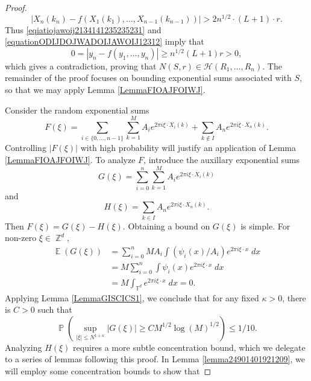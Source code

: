 \documentclass[dvipsnames,letterpaper,12pt]{article}
\numberwithin{equation}{section}
\DeclareMathOperator{\ZZ}{\mathbb{Z}}
\DeclareMathOperator{\TT}{\mathbb{T}}
\numberwithin{theorem}{section}
\DeclareMathOperator{\EE}{\mathbb{E}}
\DeclareMathOperator{\PP}{\mathbb{P}}
\begin{document}
\begin{proof}
    \begin{equation} \label{equationODIJDOJWADOIJAWOIJ12312}
        |X_n(k_n) - f(X_1(k_1),\dots,X_{n-1}(k_{n-1}))| > 2n^{1/2} \cdot (L+1) \cdot r.
    \end{equation}
    Thus \eqref{eqiatiojawoij2134141235235231} and \eqref{equationODIJDOJWADOIJAWOIJ12312} imply that
    \begin{equation}
        0 = |y_n - f(y_1,\dots,y_n)| \geq n^{1/2} (L+1) r > 0,
    \end{equation}
    which gives a contradiction, proving that $N(S,r) \in \mathcal{H}(R_1,\dots,R_n)$. The remainder of the proof focuses on bounding exponential sums associated with $S$, so that we may apply Lemma \ref{LemmaFIOAJFOIWJ}.


    Consider the random exponential sums
    \[ F(\xi) = \sum_{i \in \{ 0, \dots, n-1 \}} \sum_{k = 1}^M A_i e^{2 \pi i \xi \cdot X_i(k)} + \sum_{k \not \in I} A_n e^{2 \pi i \xi \cdot X_n(k)}. \]
    Controlling $|F(\xi)|$ with high probability will justify an application of Lemma \ref{LemmaFIOAJFOIWJ}. To analyze $F$, introduce the auxillary exponential sums
    \[ G(\xi) = \sum_{i = 0}^n \sum_{k = 1}^M A_i e^{2 \pi i \xi \cdot X_i(k)} \]
    and
    \[ H(\xi) = \sum_{k \in I} A_n e^{2 \pi i \xi \cdot X_n(k)}. \]
    Then $F(\xi) = G(\xi) - H(\xi)$.
    Obtaining a bound on $G(\xi)$ is simple. For non-zero $\xi \in \ZZ^d$,
    \begin{equation}
    \begin{split}
        \EE(G(\xi)) &= \sum_{i = 0}^n M A_i \int (\psi_i(x) / A_i) e^{2 \pi i \xi \cdot x}\; dx\\
        &= M \sum_{i = 0}^n \int \psi_i(x) e^{2 \pi i \xi \cdot x}\; dx\\
        &= M \int_{\TT^d} e^{2 \pi i \xi \cdot x}\; dx = 0.
    \end{split}
    \end{equation}
    Applying Lemma \ref{LemmaGISCICS1}, we conclude that for any fixed $\kappa > 0$, there is $C > 0$ such that
    \begin{equation} \label{equationCOIACOIAJCPPPPP}
        \PP \left( \sup_{|\xi| \leq N^{1 + \kappa}} |G(\xi)| \geq C M^{1/2} \log(M)^{1/2} \right) \leq 1/10.
    \end{equation}
    Analyzing $H(\xi)$ requires a more subtle concentration bound, which we delegate to a series of lemmas following this proof. In Lemma \ref{lemma24901401921209}, we will employ some concentration bounds to show that

\end{proof}
\end{document}
